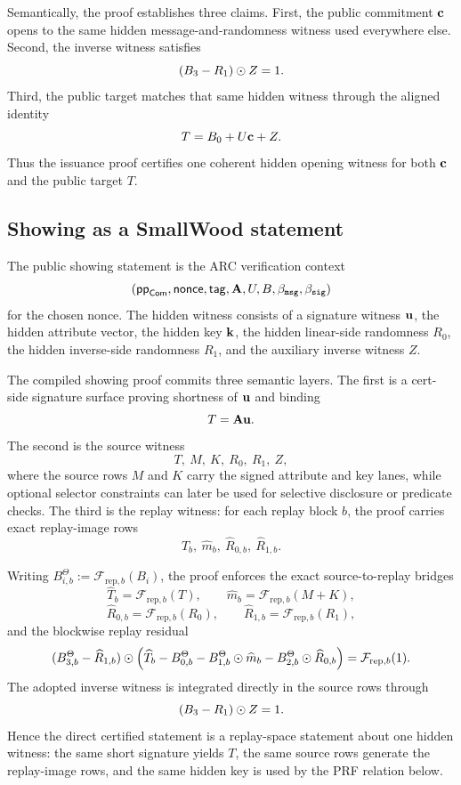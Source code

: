 Semantically, the proof establishes three claims. First, the public commitment \(\mathbf{c}\) opens to the same hidden
message-and-randomness witness used everywhere else. Second, the inverse witness satisfies
\[
(B_3-R_1)\odot Z = 1.
\]
Third, the public target matches that same hidden witness through the aligned identity
\[
T = B_0 + U\mathbf{c} + Z.
\]
Thus the issuance proof certifies one coherent hidden opening witness for both \(\mathbf{c}\) and the public target
\(T\).

\subsection{Showing as a SmallWood statement}
\label{subsec:smallwood-showing}
\label{subsec:showing-compiled}
The public showing statement is the ARC verification context
\[
(\mathsf{pp}_{\mathsf{Com}},\mathsf{nonce},\mathsf{tag},\mathbf{A},U,B,\beta_{\mathtt{msg}},\beta_{\mathtt{sig}})
\]
for the chosen nonce. The hidden witness consists of a signature witness \(\mathbf{u}\), the hidden attribute vector,
the hidden key \(\mathbf{k}\), the hidden linear-side randomness \(R_0\), the hidden inverse-side randomness \(R_1\), and
the auxiliary inverse witness \(Z\).

The compiled showing proof commits three semantic layers. The first is a cert-side signature surface proving shortness of \(\mathbf{u}\) and binding
\[
T=\mathbf{A}\mathbf{u}.
\]
The second is the source witness
\[
T,\ M,\ K,\ R_0,\ R_1,\ Z,
\]
where the source rows \(M\) and \(K\) carry the signed attribute and key lanes, while optional selector
constraints can later be used for selective disclosure or predicate checks. The third is the replay witness: for each
replay block \(b\), the proof carries exact replay-image rows
\[
\widehat T_b,\ \widehat m_b,\ \widehat R_{0,b},\ \widehat R_{1,b}.
\]

Writing \(B_{i,b}^\Theta:=\mathcal F_{\mathrm{rep},b}(B_i)\), the proof enforces the exact source-to-replay bridges
\[
\widehat T_b=\mathcal F_{\mathrm{rep},b}(T),\qquad
\widehat m_b=\mathcal F_{\mathrm{rep},b}(M+K),
\]
\[
\widehat R_{0,b}=\mathcal F_{\mathrm{rep},b}(R_0),\qquad
\widehat R_{1,b}=\mathcal F_{\mathrm{rep},b}(R_1),
\]
and the blockwise replay residual
\[
(B_{3,b}^\Theta-\widehat R_{1,b})\odot\Bigl(\widehat T_b-B_{0,b}^\Theta-B_{1,b}^\Theta\odot\widehat m_b-B_{2,b}^\Theta\odot\widehat R_{0,b}\Bigr)
=
\mathcal F_{\mathrm{rep},b}(1).
\]
The adopted inverse witness is integrated directly in the source rows through
\[
(B_3-R_1)\odot Z = 1.
\]
Hence the direct certified statement is a replay-space statement about one hidden witness: the same short signature yields \(T\), the same source rows generate the replay-image rows, and the same hidden key is used by the PRF relation below.


